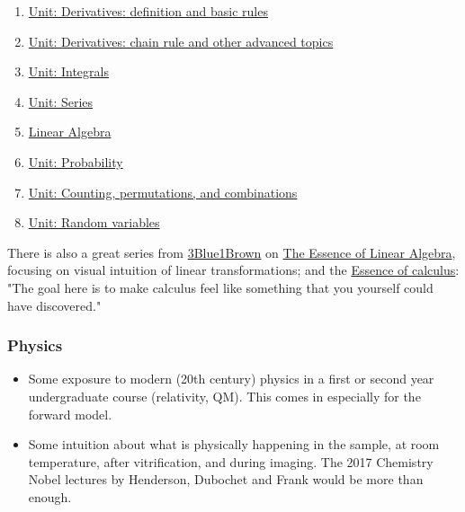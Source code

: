 \documentclass[11pt, oneside]{article}   	%
\begin{document}
\begin{enumerate}
	\item \href{https://www.khanacademy.org/math/differential-calculus/dc-diff-intro}{Unit: Derivatives: definition and basic rules} 
	\item \href{https://www.khanacademy.org/math/differential-calculus/dc-chain}{Unit: Derivatives: chain rule and other advanced topics}
	\item \href{https://www.khanacademy.org/math/integral-calculus/ic-integration} {Unit: Integrals}
	\item \href{https://www.khanacademy.org/math/integral-calculus/ic-series}{Unit: Series}
	\item \href{https://www.khanacademy.org/math/linear-algebra}{Linear Algebra}
	\item \href{https://www.khanacademy.org/math/statistics-probability/probability-library}{Unit: Probability}
	\item \href{https://www.khanacademy.org/math/statistics-probability/counting-permutations-and-combinations}{Unit: Counting, permutations, and combinations}
	\item \href{https://www.khanacademy.org/math/statistics-probability/random-variables-stats-library}{Unit: Random variables}
\end{enumerate}

There is also a great series from \href{https://www.youtube.com/c/3blue1brown}{3Blue1Brown} on \href{https://youtube.com/playlist?list=PLZHQObOWTQDPD3MizzM2xVFitgF8hE_ab}{The Essence of Linear Algebra}, focusing on visual intuition of  linear transformations; and the \href{https://youtube.com/playlist?list=PLZHQObOWTQDMsr9K-rj53DwVRMYO3t5Yr}{Essence of calculus}: "The goal here is to make calculus feel like something that you yourself could have discovered."

\subsubsection{Physics}
\begin{itemize}
	\item Some exposure to modern (20th century) physics in a first or second year undergraduate course (relativity, QM). This comes in especially for the forward model.
	\item Some intuition about what is physically happening in the sample, at room temperature, after vitrification, and during imaging. The 2017 Chemistry Nobel lectures by Henderson, Dubochet and Frank would be more than enough.
\end{itemize}
\end{document}
